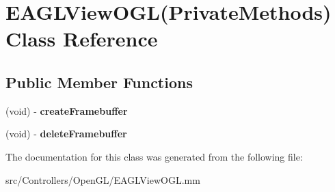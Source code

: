 \hypertarget{interface_e_a_g_l_view_o_g_l_07_private_methods_08}{
\section{\-E\-A\-G\-L\-View\-O\-G\-L(\-Private\-Methods) \-Class \-Reference}
\label{interface_e_a_g_l_view_o_g_l_07_private_methods_08}
}
\subsection*{\-Public \-Member \-Functions}
\begin{DoxyCompactItemize}
\item 
\hypertarget{interface_e_a_g_l_view_o_g_l_07_private_methods_08_a39d053d6a31e7e17e051d5619e540e5a}{
(void) -\/ {\bfseries create\-Framebuffer}}
\label{interface_e_a_g_l_view_o_g_l_07_private_methods_08_a39d053d6a31e7e17e051d5619e540e5a}

\item 
\hypertarget{interface_e_a_g_l_view_o_g_l_07_private_methods_08_a1c17b725fb83474976fbd1fa50eeeaa1}{
(void) -\/ {\bfseries delete\-Framebuffer}}
\label{interface_e_a_g_l_view_o_g_l_07_private_methods_08_a1c17b725fb83474976fbd1fa50eeeaa1}

\end{DoxyCompactItemize}


\-The documentation for this class was generated from the following file\-:\begin{DoxyCompactItemize}
\item 
src/\-Controllers/\-Open\-G\-L/\-E\-A\-G\-L\-View\-O\-G\-L.\-mm\end{DoxyCompactItemize}
